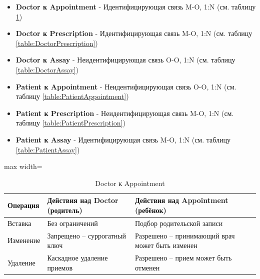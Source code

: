 \documentclass[a4paper, 14pt]{extarticle}
\begin{document}
\begin{itemize}
  \item \textbf{Doctor к Appointment} - Идентифицирующая связь M-O, 1:N (см. таблицу \ref{table:DoctorAppointment})
  \item \textbf{Doctor к Prescription} - Идентифицирующая связь M-O, 1:N (см. таблицу \ref{table:DoctorPrescription})
  \item \textbf{Doctor к Assay} - Неидентифицирующая связь O-O, 1:N (см. таблицу \ref{table:DoctorAssay})
  \item \textbf{Patient к Appointment} - Неидентифицирующая связь O-O, 1:N (см. таблицу \ref{table:PatientAppointment})
  \item \textbf{Patient к Prescription} - Неидентифицирующая связь M-O, 1:N (см. таблицу \ref{table:PatientPrescription})
  \item \textbf{Patient к Assay} - Идентифицирующая связь M-O, 1:N (см. таблицу \ref{table:PatientAssay})
\end{itemize}


\begin{table}[h!]
\centering
\captionsetup{singlelinecheck=false, position=top}
\caption{Doctor к Appointment}
\begin{adjustbox}{max width=\textwidth}
\begin{tabular}{|p{}|p{}|p{}|}
\hline
\textbf{Операция} & \textbf{Действия над Doctor (родитель)} & \textbf{Действия над Appointment (ребёнок)} \\
\hline
Вставка & Без ограничений & Подбор родительской записи \\
\hline
Изменение & Запрещено -- суррогатный ключ & Разрешено -- принимающий врач может быть изменен \\
\hline
Удаление & Каскадное удаление приемов & Разрешено -- прием может быть отменен \\
\hline
\end{tabular}
\end{adjustbox}
\label{table:DoctorAppointment}
\end{table}
\end{document}
